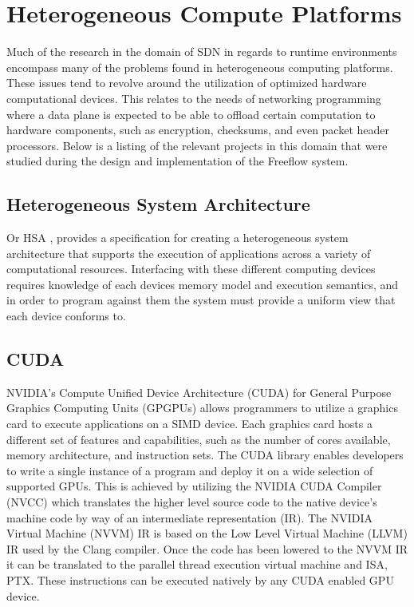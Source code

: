 \section{Heterogeneous Compute Platforms}
\label{related:hcp}
Much of the research in the domain of SDN in regards to runtime environments
encompass many of the problems found in heterogeneous computing platforms.
These issues tend to revolve around the utilization of optimized hardware
computational devices. This relates to the needs of networking programming
where a data plane is expected to be able to offload certain computation to
hardware components, such as encryption, checksums, and even packet header
processors. Below is a listing of the relevant projects in this domain that
were studied during the design and implementation of the Freeflow system.

\subsection{Heterogeneous System Architecture}
\label{related:hcp:hsa}
Or HSA \cite{hsa}, provides a specification for creating a heterogeneous
system architecture that supports the execution of applications across a 
variety of computational resources. Interfacing with these different computing 
devices requires knowledge of each devices memory model and execution 
semantics, and in order to program against them the system must provide a 
uniform view that each device conforms to.

\subsection{CUDA}
\label{related:hcp:cuda}
NVIDIA's Compute Unified Device Architecture (CUDA) \cite{cuda} for General 
Purpose Graphics Computing Units (GPGPUs) allows programmers to utilize a 
graphics card to execute applications on a SIMD device. Each graphics card 
hosts a different set of features and capabilities, such as the number of cores
available, memory architecture, and instruction sets. The CUDA library
enables developers to write a single instance of a program and deploy
it on a wide selection of supported GPUs. This is achieved by utilizing the
NVIDIA CUDA Compiler (NVCC) which translates the higher level source code
to the native device's machine code by way of an intermediate representation
(IR). The NVIDIA Virtual Machine (NVVM) IR is based on the Low Level Virtual
Machine (LLVM) IR used by the Clang compiler. Once the code has been lowered
to the NVVM IR it can be translated to the parallel thread execution virtual
machine and ISA, PTX. These instructions can be executed natively by any CUDA
enabled GPU device.

